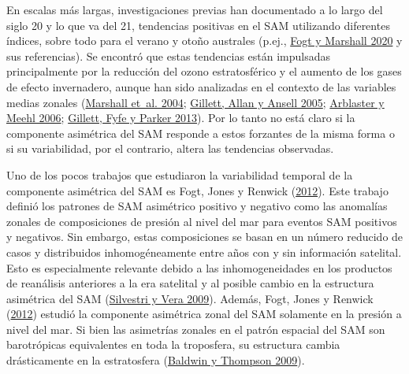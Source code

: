 \documentclass[12pt,oneside,a4paper]{reedthesis}
\begin{document}
En escalas más largas, investigaciones previas han documentado a lo largo del siglo 20 y lo que va del 21, tendencias positivas en el SAM utilizando diferentes índices, sobre todo para el verano y otoño australes (p.ej., \protect\hyperlink{ref-fogt2020}{Fogt y Marshall 2020} y sus referencias).
Se encontró que estas tendencias están impulsadas principalmente por la reducción del ozono estratosférico y el aumento de los gases de efecto invernadero, aunque han sido analizadas en el contexto de las variables medias zonales (\protect\hyperlink{ref-marshall2004}{Marshall et~al. 2004}; \protect\hyperlink{ref-gillett2005}{Gillett, Allan y Ansell 2005}; \protect\hyperlink{ref-arblaster2006}{Arblaster y Meehl 2006}; \protect\hyperlink{ref-gillett2013}{Gillett, Fyfe y Parker 2013}).
Por lo tanto no está claro si la componente asimétrica del SAM responde a estos forzantes de la misma forma o si su variabilidad, por el contrario, altera las tendencias observadas.

Uno de los pocos trabajos que estudiaron la variabilidad temporal de la componente asimétrica del SAM es Fogt, Jones y Renwick (\protect\hyperlink{ref-fogt2012}{2012}).
Este trabajo definió los patrones de SAM asimétrico positivo y negativo como las anomalías zonales de composiciones de presión al nivel del mar para eventos SAM positivos y negativos.
Sin embargo, estas composiciones se basan en un número reducido de casos y distribuidos inhomogéneamente entre años con y sin información satelital.
Esto es especialmente relevante debido a las inhomogeneidades en los productos de reanálisis anteriores a la era satelital y al posible cambio en la estructura asimétrica del SAM (\protect\hyperlink{ref-silvestri2009}{Silvestri y Vera 2009}).
Además, Fogt, Jones y Renwick (\protect\hyperlink{ref-fogt2012}{2012}) estudió la componente asimétrica zonal del SAM solamente en la presión a nivel del mar.
Si bien las asimetrías zonales en el patrón espacial del SAM son barotrópicas equivalentes en toda la troposfera, su estructura cambia drásticamente en la estratosfera (\protect\hyperlink{ref-baldwin2009}{Baldwin y Thompson 2009}).
\end{document}
